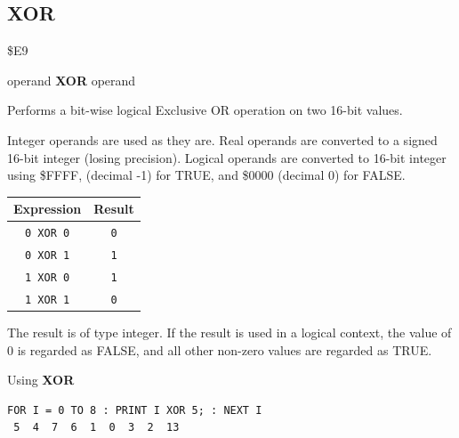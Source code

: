 \subsection{XOR}
\begin{description}[leftmargin=2cm,style=nextline]
\item [Token:]    \$E9

\item [Format:]   operand {\bf XOR} operand

\item [Usage:]    Performs a bit-wise logical Exclusive OR operation on two 16-bit values.

                  Integer operands are used as they are. Real operands are converted to a signed 16-bit integer (losing precision). Logical operands are converted to 16-bit integer using \$FFFF, (decimal -1) for TRUE, and \$0000 (decimal 0) for FALSE.

                  \begin{center}
                  \setlength{\tabcolsep}{1mm}
                     \begin{tabular}{|c|c|}
                     \hline
                     {\bf Expression} & {\bf Result}  \\
                     \hline
                        \texttt{0 XOR 0}  &  \texttt{0} \\
                        \texttt{0 XOR 1}  &  \texttt{1} \\
                        \texttt{1 XOR 0}  &  \texttt{1} \\
                        \texttt{1 XOR 1}  &  \texttt{0} \\
                     \hline
                     \end{tabular}
                  \end{center}

\item [Remarks:]  The result is of type integer. If the result is used in a logical context, the value of 0 is regarded as FALSE, and all other non-zero values are regarded as TRUE.

\item [Example:]  Using {\bf XOR}

\begin{tcolorbox}[colback=black,coltext=white]
\verbatimfont{\codefont}
\begin{verbatim}
FOR I = 0 TO 8 : PRINT I XOR 5; : NEXT I
 5  4  7  6  1  0  3  2  13
\end{verbatim}
\end{tcolorbox}
\end{description}

